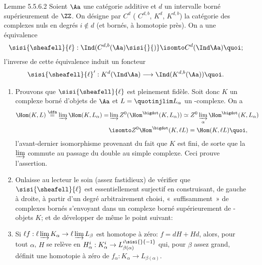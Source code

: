 \documentclass[10pt]{../fichiers-configuration-latex/smfart}
\begin{document}
\begin{enonce*}{Lemme 5.5.6.2}
Soient $\Aa$ une catégorie additive et $d$ un intervalle borné
supérieurement de $\ZZ$. On désigne par $C^{d}$ (\resp
$C^{d,b}$, \resp $K^{d}$, \resp $K^{d,b}$) la catégorie des complexes
nuls en degrés $i\not\in d$ (\resp et bornés, \resp à homotopie
près). On a une équivalence
$$
\sisi{\sheafell }{\ell}:\Ind(C^{d,b}(\Aa)\sisi{}{)}\isomto
C^{d}(\Ind\Aa){\quoi};
$$
l'inverse de cette équivalence induit un foncteur
$$
\sisi{\sheafell }{\ell}':K^{d}(\Ind\Aa)\longrightarrow
\Ind(K^{d,b}(\Aa)){\quoi}.
$$
\end{enonce*}

\begin{enumerate}
\renewcommand{\theenumi}{\Alph{enumi}}
\renewcommand{\labelenumi}{\theenumi)}
\item Prouvons que $\sisi{\sheafell }{\ell}$ est pleinement fidèle. Soit donc $K$ un
complexe borné d'objets de $\Aa$ et $L=\quotinjlim
L_{\alpha}$ un \iInd-complexe. On a
\begin{align*}
\Hom(K,L)\overset{\dfn}{=} \varinjlim \Hom(K,L_{\alpha})  = & \varinjlim
Z^{0}(\Hom^{\bigdot} (K,L_{\alpha}))\simeq Z^{0}
\varinjlim_{\alpha} \Hom^{\bigdot} (K,L_{\alpha})\\
& \isomto
Z^{0} \Hom^{\bigdot} (K,\ell L)=\Hom(K,\ell L){\quoi},
\end{align*}
l'avant-dernier isomorphisme provenant du fait que $K$ est fini, de
sorte que la $\varinjlim$ commute au passage du double au simple
complexe. Ceci prouve l'assertion.

\item On\pageoriginale laisse au lecteur le soin (assez fastidieux) de
vérifier que $\sisi{\sheafell }{\ell}$ est essentiellement surjectif en construisant,
de gauche à droite, à partir d'un degré arbitrairement choisi, « suffisamment »  de complexes bornés s'envoyant dans un complexe
borné supérieurement de \iInd-objets $K$; et de développer de même le
point suivant:

\item Si $\ell f:\ell \varinjlim K_{\alpha}\rightarrow \ell \varinjlim
L_{\beta}$ est homotope à zéro: $f=dH+Hd$, alors, pour tout $\alpha$,
$H$ se relève en $H^{i}_{\alpha}:K^{i}_{\alpha}\rightarrow
L^{i\sisi{}{-1}}_{\beta(\alpha)}$ qui, pour $\beta$ assez grand, définit une
homotopie à zéro de $f_{\alpha}:K_{\alpha}\rightarrow L_{\beta(\alpha)}$.
\end{enumerate}

\setcounter{subsubsection}{6}
\setcounter{paragraph}{2}
\end{document}
